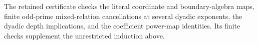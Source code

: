 The retained certificate
checks the literal coordinate and boundary-algebra maps,
finite odd-prime mixed-relation cancellations at several
dyadic exponents, the dyadic depth implications, and the
coefficient power-map identities.
Its finite checks supplement the unrestricted induction above.
